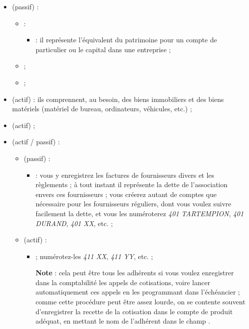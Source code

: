 \begin{itemize}
	 \item {} (passif) :
		\begin{itemize}
			 \item {} :
				 \begin{itemize}
					 \item {} : il représente l'équivalent du patrimoine pour un compte de particulier ou le capital dans une entreprise ;
				\end{itemize}
			\item {} ;	
			\item {} ;	
		\end{itemize} 
	 \item {} (actif) : ils comprennent, au besoin, des biens immobiliers et des biens matériels (matériel de bureau, ordinateurs, véhicules, etc.) ;
	 \item {} (actif) ;
	 \item {} (actif / passif) :
		 \begin{itemize}
			 \item {} (passif) :
				 \begin{itemize}
					\item {} : vous y enregistrez les factures de fournisseurs divers et les règlements ; à tout instant il représente la dette de l'association envers ces fournisseurs ; vous créerez autant de comptes que nécessaire pour les fournisseurs réguliers, dont vous voulez suivre facilement la dette, et vous les numéroterez \emph{401 TARTEMPION}, \emph{401 DURAND}, \emph{401 XX}, etc. ;
				 \end{itemize}
			 \item {} (actif) :
				 \begin{itemize} 
					\item {} ; numérotez-les \emph{411 XX}, \emph{411 YY}, etc. ; 

\textbf{Note} : cela peut être tous les adhérents si vous voulez enregistrer dans la comptabilité les appels de cotisations, voire lancer automatiquement ces appels en les programmant dans l'échéancier ; comme cette procédure peut être assez lourde, on se contente souvent d'enregistrer la recette de la cotisation dans le compte de produit adéquat, en mettant le nom de l'adhérent dans le champ .


\end{itemize}
\end{itemize}
\end{itemize}

